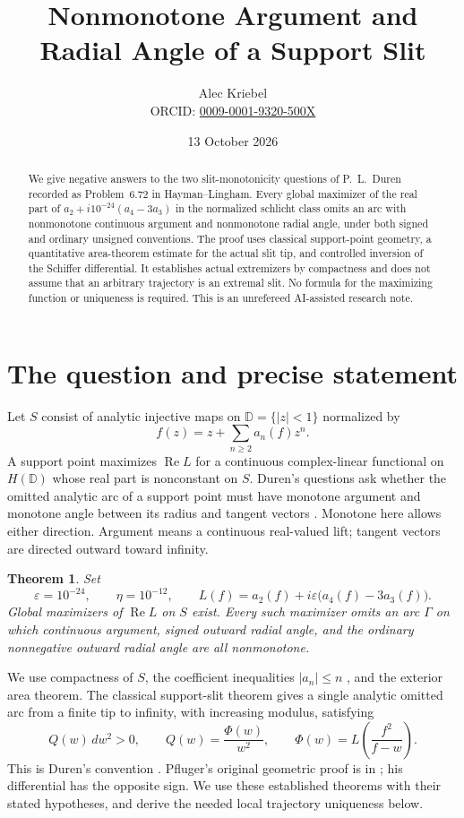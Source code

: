 \documentclass[10pt]{article}
\title{Nonmonotone Argument and Radial Angle of a Support Slit}
\author{Alec Kriebel\\
 \small ORCID: \href{https://orcid.org/0009-0001-9320-500X}{0009-0001-9320-500X}}
\date{13 October 2026}
\newtheorem{theorem}{Theorem}
\newcommand{\eps}{\varepsilon}
\newcommand{\D}{\mathbb D}
\newcommand{\Rea}{\operatorname{Re}}
\begin{document}
\maketitle
\begin{abstract}
We give negative answers to the two slit-monotonicity questions of
P.~L.~Duren recorded as Problem~6.72 in Hayman--Lingham.
Every global maximizer of the real part of
\(a_2+i10^{-24}(a_4-3a_3)\) in the normalized schlicht class
omits an arc with nonmonotone continuous argument and nonmonotone radial
angle, under both signed and ordinary unsigned conventions.
The proof uses classical support-point geometry, a quantitative area-theorem
estimate for the actual slit tip, and controlled inversion of the
Schiffer differential. It establishes actual extremizers by compactness
and does not assume that an arbitrary trajectory is an extremal slit.
No formula for the maximizing function or uniqueness is required.
This is an unrefereed AI-assisted research note.
\end{abstract}

\section{The question and precise statement}
Let \(S\) consist of analytic injective maps on \(\D=\{|z|<1\}\)
normalized by
\[
                 f(z)=z+\sum_{n\ge2}a_n(f)z^n.
\]
A support point maximizes \(\Rea L\) for a continuous complex-linear
functional on \(H(\D)\) whose real part is nonconstant on \(S\).
Duren's questions ask whether the omitted analytic arc of a support
point must have monotone argument and monotone angle between its radius
and tangent vectors \cite[Problem 6.72]{HL}. Monotone here allows either
direction. Argument means a continuous real-valued lift; tangent vectors
are directed outward toward infinity.

\begin{theorem}\label{main}
Set
\[
 \eps=10^{-24},\qquad \eta=10^{-12},\qquad
 L(f)=a_2(f)+i\eps\bigl(a_4(f)-3a_3(f)\bigr).
\]
Global maximizers of \(\Rea L\) on \(S\) exist. Every such maximizer
omits an arc \(\Gamma\) on which continuous argument, signed outward
radial angle, and the ordinary nonnegative outward radial angle
are all nonmonotone.
\end{theorem}

We use compactness of \(S\), the coefficient inequalities
\(|a_n|\le n\) \cite{deBranges}, and the exterior area theorem.
The classical support-slit theorem gives a single analytic omitted arc
from a finite tip to infinity, with increasing modulus, satisfying
\begin{equation}\label{schiffer}
 Q(w)\,dw^2>0,\qquad
 Q(w)=\frac{\Phi(w)}{w^2},\qquad
 \Phi(w)=L\left(\frac{f^2}{f-w}\right).
\end{equation}
This is Duren's convention \cite[pp.352--355]{Duren}.
Pfluger's original geometric proof is in
\cite[\S\S4.1--4.5]{Pfluger}; his differential has the opposite sign.
We use these established theorems with their stated hypotheses, and
derive the needed local trajectory uniqueness below.
\end{document}
